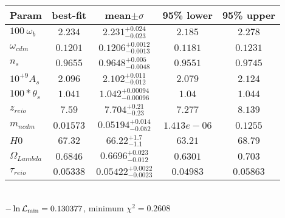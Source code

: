 \begin{tabular}{|l|c|c|c|c|} 
 \hline 
Param & best-fit & mean$\pm\sigma$ & 95\% lower & 95\% upper \\ \hline 
$100~\omega{}_{b }$ &$2.234$ & $2.231_{-0.023}^{+0.024}$ & $2.185$ & $2.278$ \\ 
$\omega{}_{cdm }$ &$0.1201$ & $0.1206_{-0.0013}^{+0.0012}$ & $0.1181$ & $0.1231$ \\ 
$n_{s }$ &$0.9655$ & $0.9648_{-0.0048}^{+0.005}$ & $0.9551$ & $0.9745$ \\ 
$10^{+9}A_{s }$ &$2.096$ & $2.102_{-0.012}^{+0.011}$ & $2.079$ & $2.124$ \\ 
$100*\theta{}_{s }$ &$1.041$ & $1.042_{-0.00096}^{+0.00094}$ & $1.04$ & $1.044$ \\ 
$z_{reio }$ &$7.59$ & $7.704_{-0.23}^{+0.21}$ & $7.277$ & $8.139$ \\ 
$m_{ncdm }$ &$0.01573$ & $0.05194_{-0.052}^{+0.014}$ & $1.413e-06$ & $0.1255$ \\ 
$H0$ &$67.32$ & $66.22_{-1.1}^{+1.7}$ & $63.21$ & $68.79$ \\ 
$\Omega{}_{Lambda }$ &$0.6846$ & $0.6696_{-0.012}^{+0.023}$ & $0.6301$ & $0.703$ \\ 
$\tau{}_{reio }$ &$0.05338$ & $0.05422_{-0.0023}^{+0.0022}$ & $0.04983$ & $0.05863$ \\ 
\hline 
 \end{tabular} \\ 
$-\ln{\cal L}_\mathrm{min} =0.130377$, minimum $\chi^2=0.2608$ \\ 
